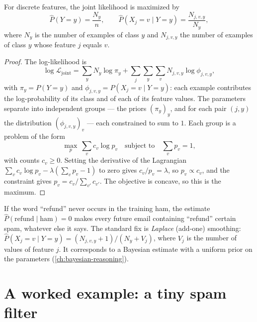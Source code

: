 \begin{notechapter}
\begin{proposition}\label{generative-discriminative:prop:counts}
For discrete features, the joint likelihood is maximized by
\[
  \hat P(Y = y) = \frac{N_y}{n},\qquad
  \hat P(X_j = v\mid Y = y) = \frac{N_{j,v,y}}{N_y},
\]
where $N_y$ is the number of examples of class $y$ and $N_{j,v,y}$ the number of
examples of class $y$ whose feature $j$ equals $v$.
\end{proposition}

\begin{proof}
The log-likelihood is
\[
  \log\mathcal L_{\mathrm{joint}} = \sum_{y} N_y\log\pi_y
  + \sum_{j}\sum_{y}\sum_v N_{j,v,y}\log\phi_{j,v,y},
\]
with $\pi_y = P(Y = y)$ and $\phi_{j,v,y} = P(X_j = v\mid Y = y)$: each example
contributes the log-probability of its class and of each of its feature values.
The parameters separate into independent groups --- the priors $(\pi_y)_y$, and
for each pair $(j,y)$ the distribution $(\phi_{j,v,y})_v$ --- each constrained
to sum to $1$. Each group is a problem of the form
\[
  \max_{p}\ \sum_v c_v\log p_v\quad\text{subject to}\quad \sum_v p_v = 1,
\]
with counts $c_v\geq0$. Setting the derivative of the Lagrangian
$\sum_v c_v\log p_v - \lambda(\sum_v p_v - 1)$ to zero gives $c_v/p_v = \lambda$,
so $p_v\propto c_v$, and the constraint gives $p_v = c_v/\sum_{v'}c_{v'}$. The
objective is concave, so this is the maximum.
\end{proof}

\begin{pitfall}
If the word ``refund'' never occurs in the training ham, the estimate
$\hat P(\text{refund}\mid\text{ham}) = 0$ makes every future email containing
``refund'' certain spam, whatever else it says. The standard fix is
\emph{Laplace} (add-one) smoothing:
$\hat P(X_j = v\mid Y = y) = (N_{j,v,y} + 1)/(N_y + V_j)$, where $V_j$ is the
number of values of feature $j$. It corresponds to a Bayesian estimate with a
uniform prior on the parameters (\cref{ch:bayesian-reasoning}).
\end{pitfall}

\section{A worked example: a tiny spam filter}\label{generative-discriminative:sec:spam}


\end{notechapter}
